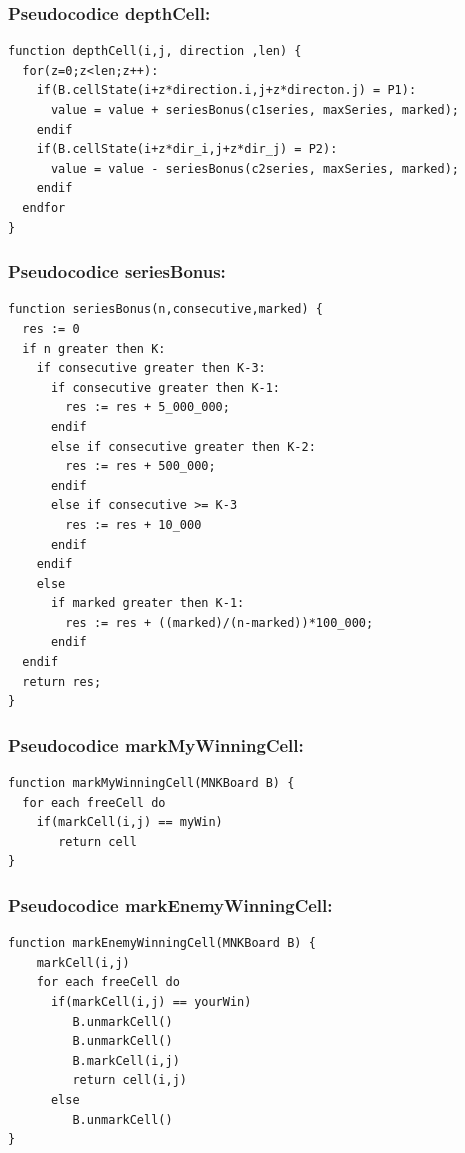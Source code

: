 \documentclass{article}
\begin{document}
    \subsubsection{Pseudocodice depthCell:}
   \lstset{language=java}
    \begin{lstlisting}[frame=single]   
function depthCell(i,j, direction ,len) {
  for(z=0;z<len;z++):
    if(B.cellState(i+z*direction.i,j+z*directon.j) = P1):
      value = value + seriesBonus(c1series, maxSeries, marked);
    endif
    if(B.cellState(i+z*dir_i,j+z*dir_j) = P2):
      value = value - seriesBonus(c2series, maxSeries, marked);
    endif
  endfor
}
    \end{lstlisting}
    
    \subsubsection{Pseudocodice seriesBonus:}
    \lstset{language=java}  
    \begin{lstlisting}[frame=single]
function seriesBonus(n,consecutive,marked) {
  res := 0
  if n greater then K:
    if consecutive greater then K-3:
      if consecutive greater then K-1:
        res := res + 5_000_000;
      endif
      else if consecutive greater then K-2:
        res := res + 500_000;
      endif
      else if consecutive >= K-3
        res := res + 10_000
      endif
    endif
    else
      if marked greater then K-1:
        res := res + ((marked)/(n-marked))*100_000;
      endif
  endif
  return res;
}

    \end{lstlisting}
 
 
 
 
 
    
    
  
\newpage
    \subsubsection{Pseudocodice markMyWinningCell:}
    \lstset{language=java}
    \begin{lstlisting}[frame=single]  
function markMyWinningCell(MNKBoard B) {
  for each freeCell do
    if(markCell(i,j) == myWin) 
       return cell
}
    \end{lstlisting}
    \subsubsection{Pseudocodice markEnemyWinningCell:}
    \lstset{language=java}
    \begin{lstlisting}[frame=single]  
function markEnemyWinningCell(MNKBoard B) {
    markCell(i,j)
    for each freeCell do
      if(markCell(i,j) == yourWin) 
         B.unmarkCell()
         B.unmarkCell()	       
         B.markCell(i,j)   
         return cell(i,j)
      else 
         B.unmarkCell()       
}
    \end{lstlisting}
\end{document}
